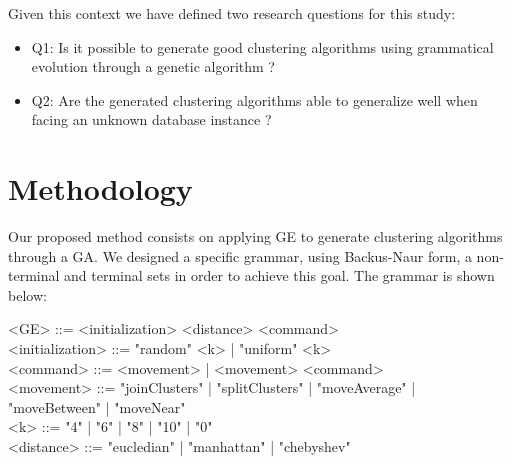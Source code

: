 \documentclass[journal]{IEEEtran}
\begin{document}
Given this context we have defined two research questions for this study:
\begin{itemize}
	\item Q1: Is it possible to generate good clustering algorithms using grammatical evolution through a genetic algorithm ? 
	\item Q2: Are the generated clustering algorithms able to generalize well when facing an unknown database instance ?
\end{itemize}

\section{Methodology} \label{sec:methodology}

Our proposed method consists on applying GE to generate clustering algorithms through a GA. We designed a specific grammar, using  Backus-Naur form, a non-terminal and terminal sets in order to achieve this goal. The grammar is shown below:

\begin{grammar}
	<GE> ::= <initialization> <distance> <command> 
	\\ <initialization> ::= "random" <k> | "uniform" <k>
	\\ <command> ::= <movement> | <movement> <command>
	\\ <movement> ::= "joinClusters" | "splitClusters" | "moveAverage" | "moveBetween" | "moveNear" 
	\\ <k> ::= "4" | "6" | "8" | "10" | "0"
	\\ <distance> ::= "eucledian" | "manhattan" | "chebyshev"
	\label{ge-clustering-grammar}
\end{grammar}
\end{document}
